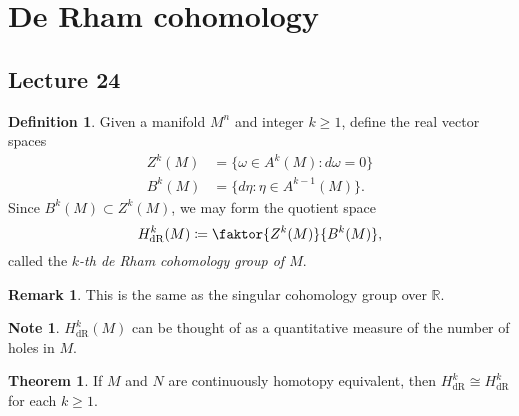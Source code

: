 \documentclass[10pt,letterpaper,cm]{nupset}
\theoremstyle{definition}
\newtheorem*{definition}{Definition}
\newtheorem{remark}{Remark}
\newtheorem{theorem}{Theorem}
\newtheorem*{note}{Note}
\newcommand{\R}{\mathbb R}
\newcommand{\1}{\mathbf{1}}
\newcommand{\0}{\vec 0}
\DeclareMathOperator{\dr}{dR}
\begin{document}
\section{De Rham cohomology}

\subsection{Lecture 24}

\begin{definition}
Given a manifold $M^n$ and integer $k\geq 1$, define the real vector spaces
\begin{align*}
  Z^k(M) &  = \{\omega \in A^k(M) : d\omega =0\}
 \\  B^k(M) & = \{ d\eta : \eta \in A^{k-1}(M)\}.
 \end{align*}
 Since $B^k(M) \subset Z^k(M)$, we may form the quotient space $$ H_{\dr}^k(M) \coloneqq  \faktor{Z^k(M)}{B^k(M)},$$ called the \textit{$k$-th de Rham cohomology group of $M$}.
\end{definition}

\begin{remark}
This is the same as the singular cohomology group over $\R$.
\end{remark}

\begin{note}
$H_{\dr}^k(M)$ can be thought of as a quantitative measure of the number of holes in $M$.
\end{note}

\begin{theorem}
If $M$ and $N$ are continuously homotopy equivalent, then $H_{\dr}^k \cong H_{\dr}^k$ for each $k\geq 1$.
\end{theorem}
\end{document}

